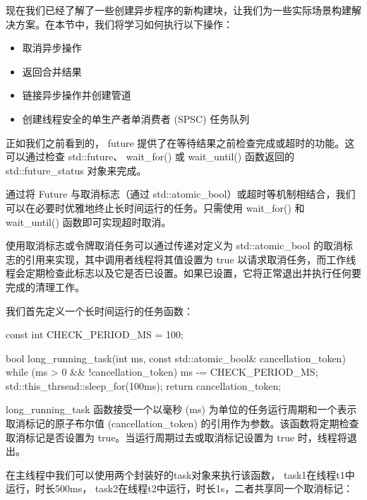 
现在我们已经了解了一些创建异步程序的新构建块，让我们为一些实际场景构建解决方案。在本节中，我们将学习如何执行以下操作：

\begin{itemize}
\item
取消异步操作

\item
返回合并结果

\item
链接异步操作并创建管道

\item
创建线程安全的单生产者单消费者 (SPSC) 任务队列
\end{itemize}


正如我们之前看到的， future 提供了在等待结果之前检查完成或超时的功能。这可以通过检查 std::future、 wait\_for() 或 wait\_until() 函数返回的 std::future\_status 对象来完成。

通过将 Future 与取消标志（通过 std::atomic\_bool）或超时等机制相结合，我们可以在必要时优雅地终止长时间运行的任务。只需使用 wait\_for() 和 wait\_until() 函数即可实现超时取消。

使用取消标志或令牌取消任务可以通过传递对定义为 std::atomic\_bool 的取消标志的引用来实现，其中调用者线程将其值设置为 true 以请求取消任务，而工作线程会定期检查此标志以及它是否已设置。如果已设置，它将正常退出并执行任何要完成的清理工作。

我们首先定义一个长时间运行的任务函数：

\begin{cpp}
const int CHECK_PERIOD_MS = 100;

bool long_running_task(int ms,
            const std::atomic_bool& cancellation_token) {
    while (ms > 0 && !cancellation_token) {
        ms -= CHECK_PERIOD_MS;
        std::this_thrsead::sleep_for(100ms);
    }
    return cancellation_token;
}
\end{cpp}

long\_running\_task 函数接受一个以毫秒 (ms) 为单位的任务运行周期和一个表示取消标记的原子布尔值 (cancellation\_token) 的引用作为参数。该函数将定期检查取消标记是否设置为 true。当运行周期过去或取消标记设置为 true 时，线程将退出。

在主线程中我们可以使用两个封装好的task对象来执行该函数， task1在线程t1中运行，时长500ms， task2在线程t2中运行，时长1s，二者共享同一个取消标记：

